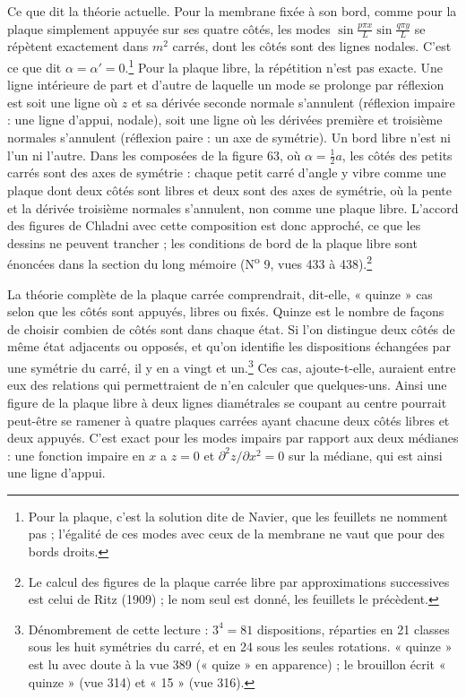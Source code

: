 \documentclass[11pt,a4paper]{article}
\begin{document}
Ce que dit la théorie actuelle. Pour la membrane fixée à son bord, comme pour la plaque simplement appuyée sur ses quatre côtés, les modes $\sin\frac{p\pi x}{L}\sin\frac{q\pi y}{L}$ se répètent exactement dans $m^2$ carrés, dont les côtés sont des lignes nodales. C'est ce que dit $\alpha=\alpha'=0$.\footnote{Pour la plaque, c'est la solution dite de Navier, que les feuillets ne nomment pas ; l'égalité de ces modes avec ceux de la membrane ne vaut que pour des bords droits.} Pour la plaque libre, la répétition n'est pas exacte. Une ligne intérieure de part et d'autre de laquelle un mode se prolonge par réflexion est soit une ligne où $z$ et sa dérivée seconde normale s'annulent (réflexion impaire : une ligne d'appui, nodale), soit une ligne où les dérivées première et troisième normales s'annulent (réflexion paire : un axe de symétrie). Un bord libre n'est ni l'un ni l'autre. Dans les composées de la figure 63, où $\alpha=\frac12a$, les côtés des petits carrés sont des axes de symétrie : chaque petit carré d'angle y vibre comme une plaque dont deux côtés sont libres et deux sont des axes de symétrie, où la pente et la dérivée troisième normales s'annulent, non comme une plaque libre. L'accord des figures de Chladni avec cette composition est donc approché, ce que les dessins ne peuvent trancher ; les conditions de bord de la plaque libre sont énoncées dans la section du long mémoire (N\textsuperscript{o} 9, vues 433 à 438).\footnote{Le calcul des figures de la plaque carrée libre par approximations successives est celui de Ritz (1909) ; le nom seul est donné, les feuillets le précèdent.}

La théorie complète de la plaque carrée comprendrait, dit-elle, « quinze » cas selon que les côtés sont appuyés, libres ou fixés. Quinze est le nombre de façons de choisir combien de côtés sont dans chaque état. Si l'on distingue deux côtés de même état adjacents ou opposés, et qu'on identifie les dispositions échangées par une symétrie du carré, il y en a vingt et un.\footnote{Dénombrement de cette lecture : $3^4=81$ dispositions, réparties en 21 classes sous les huit symétries du carré, et en 24 sous les seules rotations. « quinze » est lu avec doute à la vue 389 (« quize » en apparence) ; le brouillon écrit « quinze » (vue 314) et « 15 » (vue 316).} Ces cas, ajoute-t-elle, auraient entre eux des relations qui permettraient de n'en calculer que quelques-uns. Ainsi une figure de la plaque libre à deux lignes diamétrales se coupant au centre pourrait peut-être se ramener à quatre plaques carrées ayant chacune deux côtés libres et deux appuyés. C'est exact pour les modes impairs par rapport aux deux médianes : une fonction impaire en $x$ a $z=0$ et $\partial^2z/\partial x^2=0$ sur la médiane, qui est ainsi une ligne d'appui.
\end{document}
